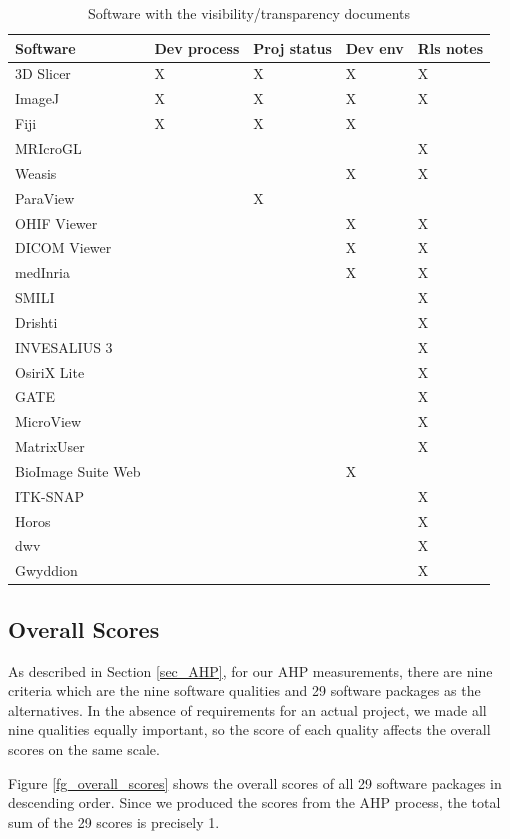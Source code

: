 \documentclass[3p, 12pt,authoryear]{elsarticle}
\begin{document}
\begin{table}[ht]
\centering
\begin{tabular}{lllll}
\hline
Software & Dev process & Proj status & Dev env & Rls notes \\ \hline
3D Slicer & X & X & X & X \\
ImageJ & X & X & X & X \\
Fiji & X & X & X &  \\
MRIcroGL &  &  &  & X \\
Weasis &  &  & X & X \\
ParaView &  & X &  &  \\
OHIF Viewer &  &  & X & X \\
DICOM Viewer &  &  & X & X \\
medInria &  &  & X & X \\
SMILI &  &  &  & X \\
Drishti &  &  &  & X \\
INVESALIUS 3 &  &  &  & X \\
OsiriX Lite &  &  &  & X \\
GATE &  &  &  & X \\
MicroView &  &  &  & X \\
MatrixUser &  &  &  & X \\
BioImage Suite Web &  &  & X &  \\
ITK-SNAP &  &  &  & X \\
Horos &  &  &  & X \\
dwv &  &  &  & X \\
Gwyddion &  &  &  & X \\ \hline
\end{tabular}
\caption{\label{tab_Visibility/Transparency_docs}Software with the visibility/transparency documents}
\end{table}

\subsection{Overall Scores}

As described in Section \ref{sec_AHP}, for our AHP measurements, there are nine
criteria which are the nine software qualities and 29 software packages as the
alternatives. In the absence of requirements for an actual project, we made all
nine qualities equally important, so the score of each quality affects the
overall scores on the same scale.

Figure \ref{fg_overall_scores} shows the overall scores of all 29 software
packages in descending order. Since we produced the scores from the AHP process,
the total sum of the 29 scores is precisely 1.
\end{document}
